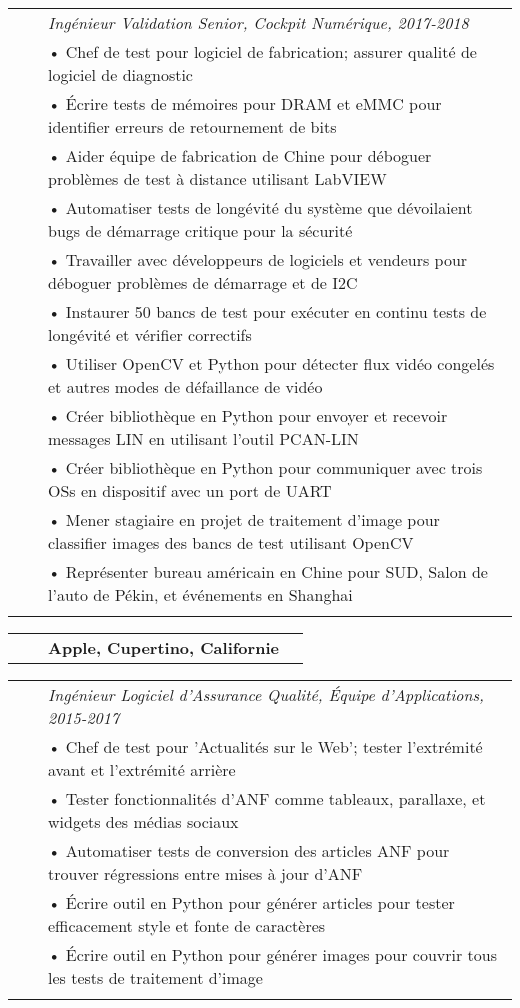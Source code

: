 \documentclass{minimal}
\begin{document}
\begin{tabular}{ p{1.5cm} p{1cm} p{16cm} }
& & \textit{Ingénieur Validation Senior, Cockpit Numérique, 2017-2018}\\
& & • Chef de test pour logiciel de fabrication; assurer qualité de logiciel de diagnostic\\
& & • Écrire tests de mémoires pour DRAM et eMMC pour identifier erreurs de retournement de bits\\
& & • Aider équipe de fabrication de Chine pour déboguer problèmes de test à distance utilisant LabVIEW\\
& & • Automatiser tests de longévité du système que dévoilaient bugs de démarrage critique pour la sécurité\\
& & • Travailler avec développeurs de logiciels et vendeurs pour déboguer problèmes de démarrage et de I2C\\
& & • Instaurer 50 bancs de test pour exécuter en continu tests de longévité et vérifier correctifs\\
& & • Utiliser OpenCV et Python pour détecter flux vidéo congelés et autres modes de défaillance de vidéo\\
& & • Créer bibliothèque en Python pour envoyer et recevoir messages LIN en utilisant l'outil PCAN-LIN\\
& & • Créer bibliothèque en Python pour communiquer avec trois OSs en dispositif avec un port de UART\\
& & • Mener stagiaire en projet de traitement d'image pour classifier images des bancs de test utilisant OpenCV\\
& & • Représenter bureau américain en Chine pour SUD, Salon de l'auto de Pékin, et événements en Shanghai\\
& & \\
\end{tabular}

\begin{tabular}{ p{1.5cm} p{1cm} p{10cm} >{\raggedleft\arraybackslash}p{3cm} }
& & \textbf{Apple, Cupertino, Californie} & \\
\end{tabular}

\begin{tabular}{ p{1.5cm} p{1cm} p{16cm} }
& & \textit{Ingénieur Logiciel d'Assurance Qualité, Équipe d'Applications, 2015-2017}\\
& & • Chef de test pour 'Actualités sur le Web'; tester l'extrémité avant et l'extrémité arrière\\ 
& & • Tester fonctionnalités d'ANF comme tableaux, parallaxe, et widgets des médias sociaux\\
& & • Automatiser tests de conversion des articles ANF pour trouver régressions entre mises à jour d'ANF\\
& & • Écrire outil en Python pour générer articles pour tester efficacement style et fonte de caractères\\
& & • Écrire outil en Python pour générer images pour couvrir tous les tests de traitement d'image\\
& & \\
\end{tabular}
\end{document}
